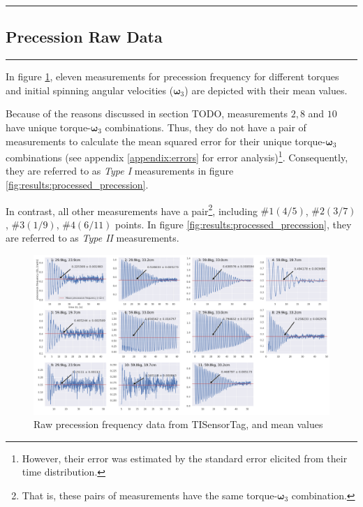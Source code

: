 {\color{gray}\hrule}
\begin{center}
\section{Precession Raw Data} \label{sec:appendix:precession_raw_data}
\end{center}
{\color{gray}\hrule}

\begin{multicols}{2}
In figure \ref{fig:appendix:raw_precession_data}, eleven measurements for precession frequency for different torques and initial spinning angular velocities ($\boldsymbol\omega_{3}$) are depicted with their mean values.

Because of the reasons discussed in section TODO, measurements $2, 8$ and $10$ have unique torque-$\boldsymbol\omega_3$ combinations. Thus, they do not have a pair of measurements to calculate the mean squared error for their unique torque-$\boldsymbol\omega_3$ combinations (see appendix \ref{appendix:errors} for error analysis)\footnote{However, their error was estimated by the standard error elicited from their time distribution.}. Consequently, they are referred to as \emph{Type I} measurements in figure \ref{fig:results:processed_precession}.

In contrast, all other measurements have a pair\footnote{That is, these pairs of measurements have the same torque-$\boldsymbol\omega_3$ combination.}, including $\#1 (4/5)$, $\#2 (3/7)$, $\#3 (1/9)$, $\#4 (6/11)$ points. In figure \ref{fig:results:processed_precession}, they are referred to as \emph{Type II} measurements.

\end{multicols}
\begin{figure}[!ht]
  \centering
  \includegraphics[width=\textwidth]{gyroscope/images/raw_precession}
  \caption{Raw precession frequency data from TISensorTag, and mean values}
  \label{fig:appendix:raw_precession_data}
\end{figure}


